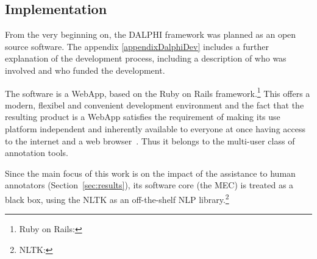 \subsection{Implementation}
	From the very beginning on, the \ac{DALPHI} framework was planned as an open source software. The appendix \ref{appendixDalphiDev} includes a further explanation of the development process, including a description of who was involved and who funded the development.

	The software is a WebApp, based on the Ruby on Rails framework.\footnote{Ruby on Rails: }
	This offers a modern, flexibel and convenient development environment and the fact that the resulting product is a WebApp satisfies the requirement of making its use platform independent and inherently available to everyone at once having access to the internet and a web browser~\cite{bachle2007ruby}. Thus it belongs to the multi-user class of annotation tools.

	Since the main focus of this work is on the impact of the assistance to human annotators (Section~\ref{sec:results}), its software core (the \ac{MEC}) is treated as a black box, using the \ac{NLTK} as an off-the-shelf \ac{NLP} library.\footnote{\ac{NLTK}: }

